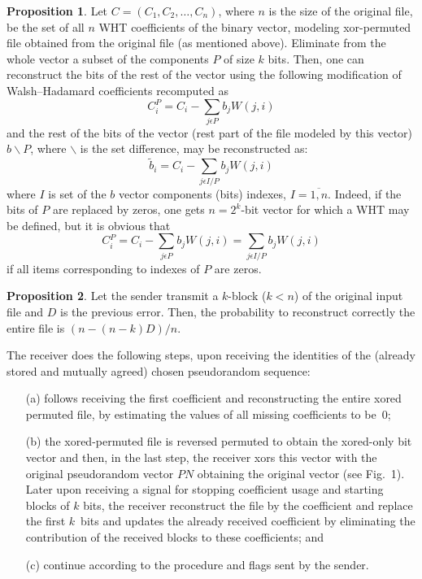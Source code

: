 \begin{multicols}{2}
\smallskip

\noindent \textbf{Proposition 1}. Let $C=(C_1,C_2,\ldots,C_n)$, where $n$ is the
size of the original file, be the set of all $n$  WHT coefficients of the binary 
vector, modeling xor-permuted file obtained from the original file (as 
mentioned above). Eliminate from the whole vector a subset of the components 
$P$ of size $k$ bits. Then, one can reconstruct the bits of the rest of the 
vector using the following modification of Walsh--Hadamard  coefficients 
recomputed as
$$
C{^P_i}=C_i- \sum\limits_{j\epsilon P} b_j W(j,i)
$$
and the rest of the bits of the vector (rest part of the file modeled by this vector) $b\backslash P$, 
where $\backslash$ is the set difference, may be reconstructed as:
$$
\tilde b_i =C_i- \sum\limits_{j\epsilon I/P} b_j W(j,i)
$$
where $I$ is set of the $b$ vector components (bits) indexes, $I=\overline{1,n}$.
Indeed, if the bits of $P$ are replaced by zeros, one gets $n=2^k $-bit vector for 
which a WHT may be defined, but it is obvious that
$$
C{^P_i}=C_i-\sum\limits_{j\epsilon P} b_j W(j,i)=\sum\limits_{j\epsilon I/P} b_j W(j,i)
$$
if all items corresponding to indexes of $P$ are zeros.

\smallskip

\noindent
\textbf{Proposition 2}. Let the sender transmit a $k$-block ($k<n$) of the original 
input file and $D$ is the previous error. Then, the probability to reconstruct correctly the entire file is $(n-(n-k)D)/n$.

\smallskip




The receiver does the following steps, upon receiving the identities of the 
(already stored and mutually agreed) chosen pseudorandom sequence: 
\begin{itemize}
\item[(a)] follows receiving the first coefficient and reconstructing the entire xored permuted file, by estimating the values of all missing coefficients to be~0;
\item[(b)] the xored-permuted file  is reversed permuted to obtain  the xored-only bit vector  and then,
in the last step, the receiver xors  
this vector  with the original pseudorandom vector $PN$ obtaining the original vector (see 
Fig.~1). Later upon receiving a signal for 
stopping coefficient usage and starting blocks of $k$ bits, the receiver reconstruct the file by the coefficient and replace the first 
$k$~bits and updates the already 
received coefficient by eliminating the contribution of the received blocks to these coefficients;
and
\item[(c)] continue according to the procedure and flags sent by the sender.
\end{itemize}


\end{multicols}
